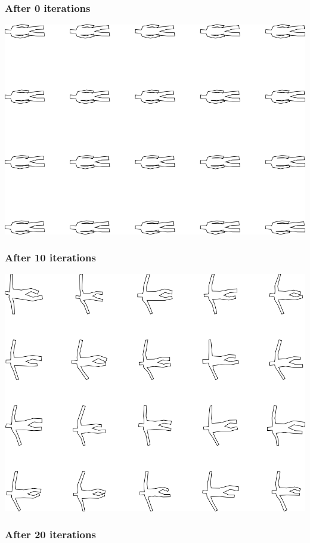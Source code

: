 \subsubsection{After 0 iterations}

\includegraphics[width=6in]{output/3.learning/simple_tuning/simple_tuning_iter0_.png}
\subsubsection{After 10 iterations}

\includegraphics[width=6in]{output/3.learning/simple_tuning/simple_tuning_iter10_.png}
\subsubsection{After 20 iterations}

